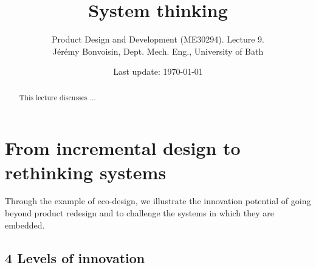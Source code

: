 \documentclass{article}
\begin{document}
\title{System thinking}

\author{Product Design and Development (ME30294). Lecture 9. \\ Jérémy Bonvoisin, Dept. Mech. Eng., University of Bath}
\date{Last update: \today}

\maketitle

\begin{abstract}
This lecture discusses ... \end{abstract}

\tableofcontents

\section{From incremental design to rethinking systems}
\label{sec:FromIncrementalDesignToRethinkingSystems}

{\color{red}Through the example of eco-design, we illustrate the innovation potential of going beyond product redesign and to challenge the systems in which they are embedded.}

\subsection{4 Levels of innovation}
\label{sec:fourlevels}
\end{document}
